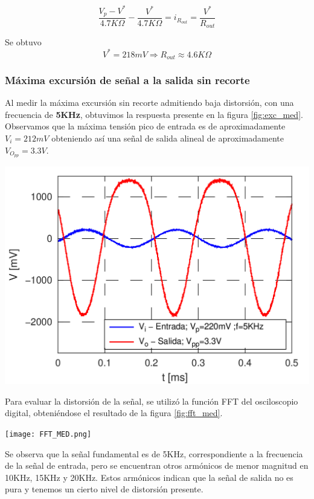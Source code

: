 \documentclass[a4paper, 10pt, spanish]{article}
\begin{document}
\begin{equation}
  \frac{V_p - V^*}{4.7K\Omega} - \frac{V^*}{4.7K\Omega} = i_{R_{out}} = \frac{V^*}{R_{out}}
\end{equation}

Se obtuvo
\begin{equation}
  V^* = 218mV \Rightarrow R_{out} \approx 4.6K\Omega
\end{equation}

\subsubsection{Máxima excursión de señal a la salida sin recorte}
Al medir la máxima excursión sin recorte admitiendo baja distorsión, con una frecuencia de \textbf{5KHz}, obtuvimos la respuesta presente en la figura \ref{fig:exc_med}. Observamos que la máxima tensión pico de entrada es de aproximadamente $V_i=212mV$ obteniendo así una señal de salida alineal de aproximadamente $V_{O_{pp}}=3.3V$.

\begin{center}
  \includegraphics[width=.7\textwidth]{excursion.png}
  \label{fig:exc_med}
\end{center}

Para evaluar la distorsión de la señal, se utilizó la función FFT del osciloscopio digital, obteniéndose el resultado de la figura \ref{fig:fft_med}.

\begin{center}
  \texttt{[image: FFT\_MED.png]}
  \label{fig:fft_med}
\end{center}

Se observa que la señal fundamental es de 5KHz, correspondiente a la frecuencia de la señal de entrada, pero se encuentran otros armónicos de menor magnitud en 10KHz, 15KHz y 20KHz. Estos armónicos indican que la señal de salida no es pura y tenemos un cierto nivel de distorsión presente.
\end{document}
